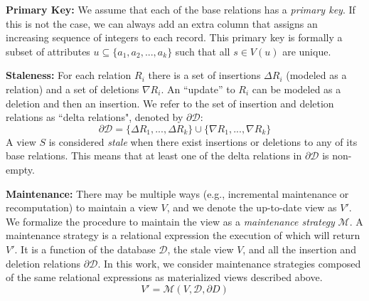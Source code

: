 \vspace{0.5em}

\noindent \textbf{Primary Key:} We assume that each of the base relations has a \emph{primary key}. If this is not the case, we can always add an extra column that assigns an increasing sequence of integers to each record. 
This primary key is formally a subset of attributes $u \subseteq \{a_1,a_2,...,a_k\}$ such that all $s \in V(u)$ are unique.

\vspace{0.5em}

\noindent \textbf{Staleness:} For each relation $R_i$ there is a set of insertions $\Delta R_i$ (modeled as a relation)
and a set of deletions $\nabla R_i$.
An ``update'' to $R_i$ can be modeled as a deletion and then an insertion.
We refer to the set of insertion and deletion relations as ``delta relations", denoted by $\partial \mathcal{D}$:
\[
	\partial \mathcal{D} = \{\Delta R_1,...,\Delta R_k\} \cup \{\nabla R_1,...,\nabla R_k\}
\]
A view $S$ is considered \emph{stale} when there exist insertions or deletions to any of its base relations.
This means that at least one of the delta relations in $\partial \mathcal{D}$ is non-empty.

\vspace{0.5em}

\noindent \textbf{Maintenance:} There may be multiple ways (e.g., incremental maintenance or recomputation) to maintain a view $V$, and we denote the up-to-date view as $V'$.
We formalize the procedure to maintain the view as a \emph{maintenance strategy} $\mathcal{M}$.
A maintenance strategy is a relational expression the execution of which will return $V'$.
It is a function of the database $\mathcal{D}$, the stale view $V$, and all the insertion and deletion relations $\partial \mathcal{D}$. 
In this work, we consider maintenance strategies composed of the same relational expressions as materialized views described above.
\[
V' = \mathcal{M}(V,\mathcal{D}, \partial D)
\]

\vspace{0.5em}

